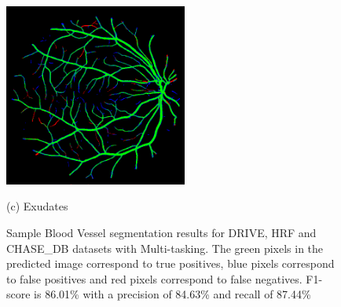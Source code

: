 \documentclass{article}
\begin{document}
\begin{figure}[!ht]
\begin{minipage}[b]{0.7\linewidth}
\centering
\centerline{\includegraphics[width=6cm]{images/19_test prediction.png}}
\centerline{(c) Exudates}\medskip
\end{minipage}

\caption{Sample Blood Vessel segmentation results for DRIVE, HRF and CHASE\_DB datasets with Multi-tasking. The green pixels in the predicted image correspond to true positives, blue pixels correspond to false positives and  red pixels correspond to false negatives. F1-score is 86.01\% with a precision of 84.63\% and recall of 87.44\% }
\label{fig:segmentation_results_with_multi_tasking}

\end{figure}
\end{document}
